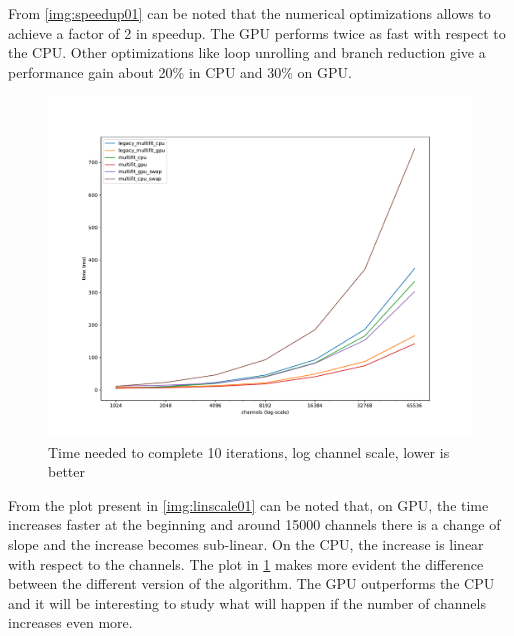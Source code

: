 From \ref{img:speedup01} can be noted that the numerical optimizations allows to achieve a factor of 2 in speedup. The GPU performs twice as fast with respect to the CPU. Other optimizations like loop unrolling and branch reduction give a performance gain about 20\% in CPU and 30\% on GPU.  
\begin{figure}[H]
  \includegraphics[width=.75\textwidth]{img/logscale}
  \caption{Time needed to complete 10 iterations, log channel scale, lower is better}
  \label{img:logscale01}
\end{figure}
From the plot present in \ref{img:linscale01} can be noted that, on GPU, the time increases faster at the beginning and around 15000 channels there is a change of slope and the increase becomes sub-linear. On the CPU, the increase is linear with respect to the channels.
The plot in \ref{img:logscale01} makes more evident the difference between the different version of the algorithm. The GPU outperforms the CPU and it will be interesting to study what will happen if the number of channels increases even more.\\

